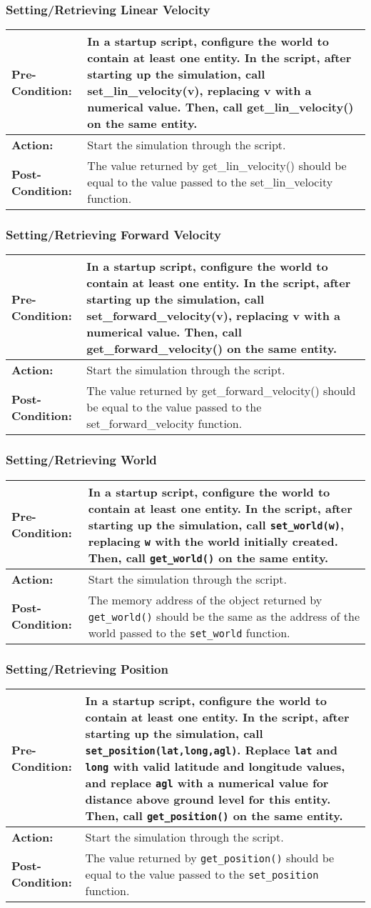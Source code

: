 \documentclass[titlepage]{article}
\newcommand{\testcase}[3]{
    \begin{center}
    \begin{tabular}{| l | p{0.7\textwidth}|}
        \hline
        \rowcolor[gray]{0.8}\textbf{Pre-Condition:} & #1 \\ \hline
        \textbf{Action:} & #2 \\ \hline
        \rowcolor[gray]{0.8}\textbf{Post-Condition:} & #3 \\ \hline
    \end{tabular}
    \end{center}
}
\begin{document}
\subsubsection{Setting/Retrieving Linear Velocity}
\testcase{In a startup script, configure the world to contain at least one entity. In the script, after starting up the
simulation, call set\_lin\_velocity(v), replacing v with a numerical value. Then, call get\_lin\_velocity() on the same entity.}{Start the simulation through the script.}{The value returned by get\_lin\_velocity() should be equal to the value passed to the set\_lin\_velocity function.}

\subsubsection{Setting/Retrieving Forward Velocity}
\testcase{In a startup script, configure the world to contain at least one entity. In the script, after starting up the simulation, call set\_forward\_velocity(v), replacing v with a numerical value. Then, call get\_forward\_velocity() on the same entity.}{Start the simulation through the script.}{The value returned by get\_forward\_velocity() should be equal to the value passed to the set\_forward\_velocity function.}

\subsubsection{Setting/Retrieving World}
\testcase{In a startup script, configure the world to contain at least one entity. In the script, after starting up the simulation, call \texttt{set\_world(w)}, replacing \texttt{w} with the world initially created. Then, call \texttt{get\_world()} on the same entity.}{Start the simulation through the script.}{The memory address of the object returned by \texttt{get\_world()} should be the same as the address of the world passed to the \texttt{set\_world} function.}

\subsubsection{Setting/Retrieving Position}
\testcase{In a startup script, configure the world to contain at least one entity. In the script, after starting up the simulation, call \texttt{set\_position(lat,long,agl)}. Replace \texttt{lat} and \texttt{long} with valid latitude and longitude values, and replace \texttt{agl} with a numerical value for distance above ground level for this entity. Then, call \texttt{get\_position()} on the same entity.}{Start the simulation through the script.}{The value returned by \texttt{get\_position()} should be equal to the value passed to the \texttt{set\_position} function.}
\end{document}
